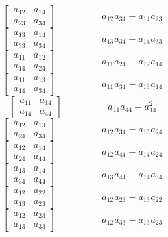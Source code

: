 $$\left[\begin{matrix}a_{12} & a_{14}\\a_{23} & a_{34}\end{matrix}\right]\hspace{2cm} a_{12} a_{34} - a_{14} a_{23}$$   
$$\left[\begin{matrix}a_{13} & a_{14}\\a_{33} & a_{34}\end{matrix}\right]\hspace{2cm} a_{13} a_{34} - a_{14} a_{33}$$   
$$\left[\begin{matrix}a_{11} & a_{12}\\a_{14} & a_{24}\end{matrix}\right]\hspace{2cm} a_{11} a_{24} - a_{12} a_{14}$$   
$$\left[\begin{matrix}a_{11} & a_{13}\\a_{14} & a_{34}\end{matrix}\right]\hspace{2cm} a_{11} a_{34} - a_{13} a_{14}$$   
$$\left[\begin{matrix}a_{11} & a_{14}\\a_{14} & a_{44}\end{matrix}\right]\hspace{2cm} a_{11} a_{44} - a_{14}^{2}$$   
$$\left[\begin{matrix}a_{12} & a_{13}\\a_{24} & a_{34}\end{matrix}\right]\hspace{2cm} a_{12} a_{34} - a_{13} a_{24}$$   
$$\left[\begin{matrix}a_{12} & a_{14}\\a_{24} & a_{44}\end{matrix}\right]\hspace{2cm} a_{12} a_{44} - a_{14} a_{24}$$   
$$\left[\begin{matrix}a_{13} & a_{14}\\a_{34} & a_{44}\end{matrix}\right]\hspace{2cm} a_{13} a_{44} - a_{14} a_{34}$$   
$$\left[\begin{matrix}a_{12} & a_{22}\\a_{13} & a_{23}\end{matrix}\right]\hspace{2cm} a_{12} a_{23} - a_{13} a_{22}$$   
$$\left[\begin{matrix}a_{12} & a_{23}\\a_{13} & a_{33}\end{matrix}\right]\hspace{2cm} a_{12} a_{33} - a_{13} a_{23}$$   
